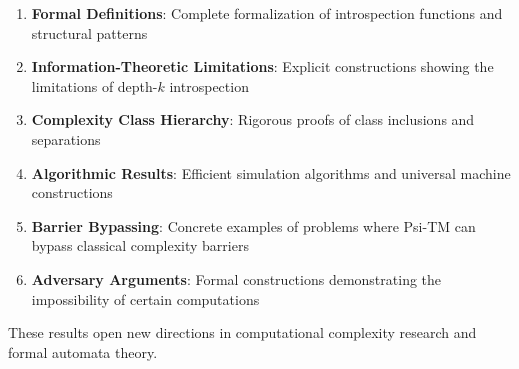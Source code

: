 \begin{enumerate}
\item \textbf{Formal Definitions}: Complete formalization of introspection functions and structural patterns
\item \textbf{Information-Theoretic Limitations}: Explicit constructions showing the limitations of depth-$k$ introspection
\item \textbf{Complexity Class Hierarchy}: Rigorous proofs of class inclusions and separations
\item \textbf{Algorithmic Results}: Efficient simulation algorithms and universal machine constructions
\item \textbf{Barrier Bypassing}: Concrete examples of problems where Psi-TM can bypass classical complexity barriers
\item \textbf{Adversary Arguments}: Formal constructions demonstrating the impossibility of certain computations
\end{enumerate}

These results open new directions in computational complexity research and formal automata theory.

